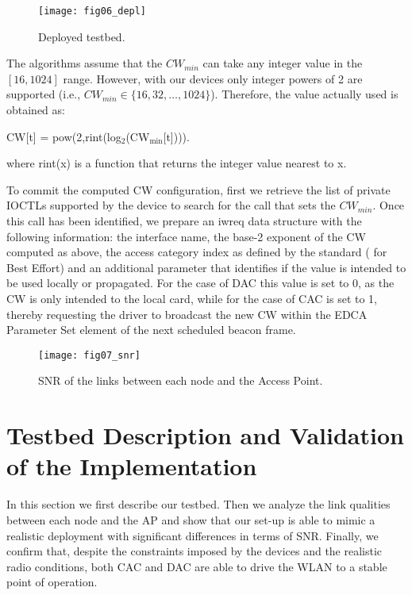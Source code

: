 \documentclass[a4paper,10pt]{article}
\begin{document}
\begin{figure}[!t]\texttt{[image: fig06\_depl]}\caption{Deployed testbed.}\label{fig:testbed}\end{figure}

The algorithms assume that the $CW_{min}$ can take any integer value in the $[16,1024]$ range. However, with our devices only integer powers of 2 are supported (i.e., $CW_{min} \in \{16, 32, \ldots, 1024\}$). Therefore, the value actually used is obtained as:
\begin{center}
{\ttfamily CW[t] = pow(2,rint(log$_2$(CW$_{\min}$[t])))}. 	
\end{center} 
where {\ttfamily rint(x)} is a function that returns the integer value nearest to {\ttfamily x}. 

To commit the computed {\ttfamily CW} configuration, first we retrieve the list of private {\ttfamily IOCTL}s supported by the device to search for the call that sets the $CW_{min}$. Once this call has been identified, we prepare an {\ttfamily iwreq} data structure with the following information: the interface name, the base-2 exponent of the {\ttfamily CW} computed as above, the access category index as defined by the standard ({} for Best Effort) and an additional parameter that identifies if the value is intended to be used locally or propagated. For the case of DAC this value is set to 0, as the {\ttfamily CW} is only intended to the local card, while for the case of CAC is set to 1, thereby requesting the driver to broadcast the new {\ttfamily CW} within the EDCA Parameter Set element of the next scheduled beacon frame. 

\begin{figure}[t]\texttt{[image: fig07\_snr]}\caption{SNR of the links between each node and the Access Point.}\label{fig:snr}\end{figure}

\section{Testbed Description and Validation of the Implementation}
\label{sec:testbed}

In this section we first describe our testbed. Then we analyze the link qualities between each node and the AP and show that our set-up is able to mimic a realistic deployment with significant differences in terms of SNR. Finally, we confirm that, despite the constraints imposed by the devices and the realistic radio conditions, both CAC and DAC are able to drive the WLAN to a stable point of operation. 
\end{document}
